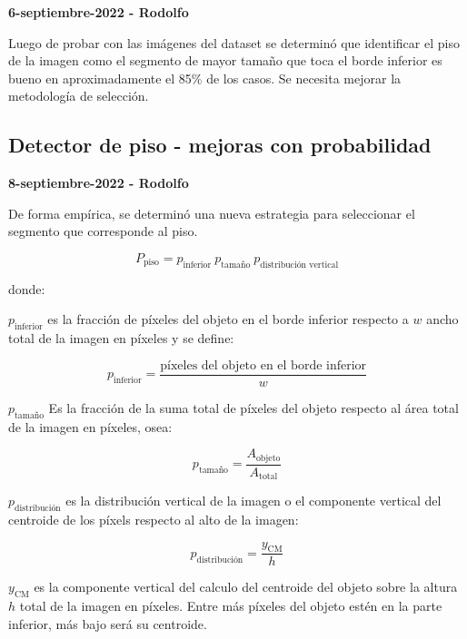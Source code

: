 \textbf{6-septiembre-2022 - Rodolfo}

Luego de probar con las imágenes del dataset se determinó que identificar el piso de la imagen como el segmento de mayor tamaño que toca el borde inferior es bueno en aproximadamente el 85\% de los casos. Se necesita mejorar la metodología de selección.

\subsection*{Detector de piso - mejoras con probabilidad}

\textbf{8-septiembre-2022 - Rodolfo}

De forma empírica, se determinó una nueva estrategia para seleccionar el segmento que corresponde al piso.


\begin{equation}
    P_{\text{piso}} = p_\text{{inferior}}\ p_\text{{tamaño}} \ p_\text{{distribución \ vertical}}    
\end{equation}

\noindent donde:

$p_\text{{inferior}} $ es la fracción de píxeles del objeto en el borde inferior respecto a $w$ ancho total de la imagen en píxeles y se define:

\begin{equation}
    p_\text{{inferior}} = \frac{\text{píxeles del objeto en el borde inferior}}{w}
\end{equation}


$p_\text{{tamaño}}$ Es la fracción de la suma total de píxeles del objeto respecto al área total de la imagen en píxeles, osea:

\begin{equation}
p_\text{{tamaño}} = \frac{A_{\text{objeto}}}{A_{\text{total}}}
\end{equation}

$p_\text{{distribución}}$ es la distribución vertical de la imagen o el componente vertical del centroide de los píxels respecto al alto de la imagen:



\begin{equation}
p_\text{{distribución}} = \frac{y_{\text{CM}}}{h}
\end{equation}

$y_{\text{CM}}$ es la componente vertical del calculo del centroide del objeto sobre la altura $h$ total de la imagen en píxeles. Entre más píxeles del objeto estén en la parte inferior, más bajo será su centroide.



